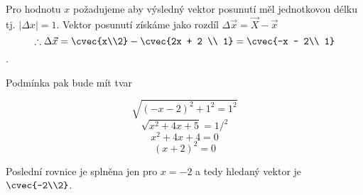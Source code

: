 Pro hodnotu $x$ požadujeme aby výsledný vektor posunutí měl jednotkovou délku tj. $|\Delta x| = 1$.  Vektor posunutí získáme jako rozdíl $\Delta \vec{x} = \vec{X} - \vec{x}$ 
    $$\therefore \Delta \vec{x} = \cvec{x\\2} - \cvec{2x + 2 \\ 1}  = \cvec{-x - 2\\ 1}$$. 

Podmínka pak bude mít tvar 

$$ \sqrt{(-x - 2)^2 + 1^2= 1^2}  $$
$$ \sqrt{x^2 + 4x + 5} = 1 /^2 $$
$$ x^2 + 4x + 4 = 0 $$
$$ (x + 2)^2 =  0 $$

Poslední rovnice je splněna jen pro $x = -2$ a tedy hledaný vektor je $\cvec{-2\\2}$.